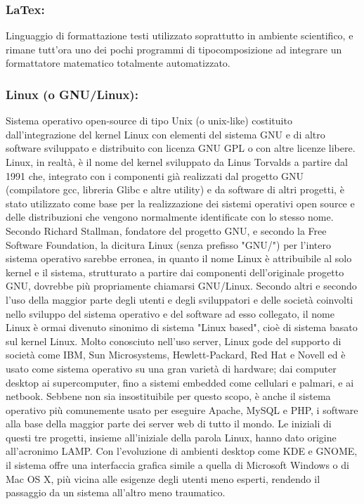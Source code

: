 \subsubsection*{LaTex:} Linguaggio di formattazione testi utilizzato
soprattutto in ambiente scientifico, e rimane tutt'ora uno dei pochi programmi
di tipocomposizione ad integrare un formattatore matematico totalmente automatizzato.

\subsubsection{Linux (o GNU/Linux):} Sistema operativo open-source di
tipo Unix (o unix-like) costituito dall'integrazione del kernel Linux con
elementi del sistema GNU e di altro software sviluppato e distribuito con
licenza GNU GPL o con altre licenze libere. Linux, in realt\`a, \`e il nome del
kernel sviluppato da Linus Torvalds a partire dal 1991 che, integrato con i
componenti gi\`a realizzati dal progetto GNU (compilatore gcc, libreria Glibc e
altre utility) e da software di altri progetti, \`e stato utilizzato come base per
la realizzazione dei sistemi operativi open source e delle distribuzioni che
vengono normalmente identificate con lo stesso nome. Secondo Richard Stallman,
fondatore del progetto GNU, e secondo la Free Software Foundation, la dicitura
Linux (senza prefisso "GNU/") per l'intero sistema operativo sarebbe erronea, in
quanto il nome Linux \`e attribuibile al solo kernel e il sistema, strutturato a
partire dai componenti dell'originale progetto GNU, dovrebbe pi\`u propriamente
chiamarsi GNU/Linux. Secondo altri e secondo l'uso della maggior parte degli
utenti e degli sviluppatori e delle societ\`a coinvolti nello sviluppo del sistema
operativo e del software ad esso collegato, il nome Linux \`e ormai divenuto
sinonimo di sistema "Linux based", cio\`e di sistema basato sul kernel Linux.
Molto conosciuto nell'uso server, Linux gode del supporto di societ\`a come IBM,
Sun Microsystems, Hewlett-Packard, Red Hat e Novell ed \`e usato come sistema
operativo su una gran variet\`a di hardware; dai computer desktop ai
supercomputer, fino a sistemi embedded come cellulari e palmari, e ai netbook.
Sebbene non sia insostituibile per questo scopo, \`e anche il sistema operativo
pi\`u comunemente usato per eseguire Apache, MySQL e PHP, i software alla base
della maggior parte dei server web di tutto il mondo. Le iniziali di questi tre
progetti, insieme all'iniziale della parola Linux, hanno dato origine
all'acronimo LAMP. Con l'evoluzione di ambienti desktop come KDE e GNOME, il
sistema offre una interfaccia grafica simile a quella di Microsoft Windows o di
Mac OS X, pi\`u vicina alle esigenze degli utenti meno esperti, rendendo il
passaggio da un sistema all'altro meno traumatico.

